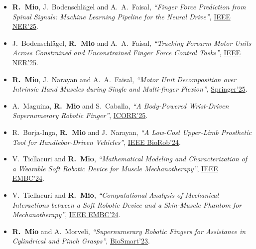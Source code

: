 \documentclass[a4paper,10pt]{article}
\begin{document}
\begin{itemize}
  \item \textbf{R.\ Mio}, J.\ Bodenschl\"agel and A.\ A.\ Faisal,
        \textit{``Finger Force Prediction from Spinal Signals: Machine Learning Pipeline for the
        Neural Drive''},
        \href{https://ieeexplore.ieee.org/document/11589004}{IEEE NER'25}.

  \item J.\ Bodenschl\"agel, \textbf{R.\ Mio} and A.\ A.\ Faisal,
        \textit{``Tracking Forearm Motor Units Across Constrained and Unconstrained Finger Force
        Control Tasks''},
        \href{https://ieeexplore.ieee.org/document/11589184}{IEEE NER'25}.

  \item \textbf{R.\ Mio}, J.\ Narayan and A.\ A.\ Faisal,
        \textit{``Motor Unit Decomposition over Intrinsic Hand Muscles during Single and
        Multi-finger Flexion''},
        \href{https://link.springer.com/chapter/10.1007/978-3-031-85000-4_25}{Springer'25}.

  \item A.\ Maguina, \textbf{R.\ Mio} and S.\ Caballa,
        \textit{``A Body-Powered Wrist-Driven Supernumerary Robotic Finger''},
        \href{https://ieeexplore.ieee.org/document/11063063}{ICORR'25}.

  \item R.\ Borja-Inga, \textbf{R.\ Mio} and J.\ Narayan,
        \textit{``A Low-Cost Upper-Limb Prosthetic Tool for Handlebar-Driven Vehicles''},
        \href{https://ieeexplore.ieee.org/document/10719816}{IEEE BioRob'24}.

  \item V.\ Ticllacuri and \textbf{R.\ Mio},
        \textit{``Mathematical Modeling and Characterization of a Wearable Soft Robotic Device
        for Muscle Mechanotherapy''},
        \href{https://ieeexplore.ieee.org/document/10782663}{IEEE EMBC'24}.

  \item V.\ Ticllacuri and \textbf{R.\ Mio},
        \textit{``Computational Analysis of Mechanical Interactions between a Soft Robotic Device
        and a Skin-Muscle Phantom for Mechanotherapy''},
        \href{https://ieeexplore.ieee.org/document/10782886}{IEEE EMBC'24}.

  \item \textbf{R.\ Mio} and A.\ Morveli,
        \textit{``Supernumerary Robotic Fingers for Assistance in Cylindrical and Pinch Grasps''},
        \href{https://ieeexplore.ieee.org/abstract/document/10162114}{BioSmart'23}.


\end{itemize}
\end{document}
